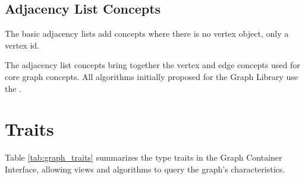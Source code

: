 \subsection{Adjacency List Concepts}
The basic adjacency lists add concepts where there is no vertex object, only a vertex id.
{\small
     
}

The adjacency list concepts bring together the vertex and edge concepts used for core graph concepts. 
All algorithms initially proposed for the Graph Library use the .
{\small
     
}

\section{Traits}
Table \ref{tab:graph_traits} summarizes the type traits in the Graph Container Interface, allowing views and algorithms to query the graph's characteristics.

